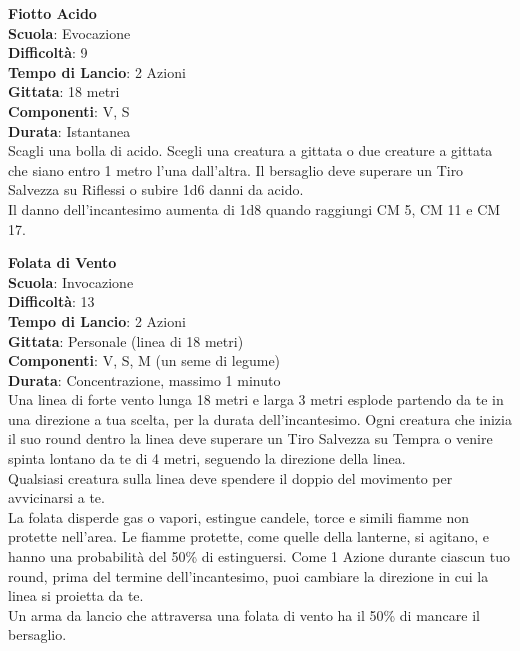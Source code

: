 \begin{multicols}{2}
\medskip\textbf{Fiotto Acido}\\
\textbf{Scuola}: Evocazione\\
\textbf{Difficoltà}: 9\\
\textbf{Tempo di Lancio}: 2 Azioni\\
\textbf{Gittata}: 18 metri\\
\textbf{Componenti}: V, S\\
\textbf{Durata}: Istantanea\\
Scagli una bolla di acido. Scegli una creatura a gittata o due creature a gittata che siano entro 1 metro l'una dall'altra. Il bersaglio deve superare un Tiro Salvezza su Riflessi o subire 1d6 danni da acido.\\
Il danno dell'incantesimo aumenta di 1d8 quando raggiungi CM 5, CM 11 e CM 17.

\medskip\textbf{Folata di Vento}\\
\textbf{Scuola}: Invocazione\\
\textbf{Difficoltà}: 13\\
\textbf{Tempo di Lancio}: 2 Azioni\\
\textbf{Gittata}: Personale (linea di 18 metri)\\
\textbf{Componenti}: V, S, M (un seme di legume)\\
\textbf{Durata}: Concentrazione, massimo 1 minuto\\
Una linea di forte vento lunga 18 metri e larga 3 metri esplode partendo da te in una direzione a tua scelta, per la durata dell'incantesimo. Ogni creatura che inizia il suo round dentro la linea deve superare un Tiro Salvezza su Tempra o venire spinta lontano da te di 4 metri, seguendo la direzione della linea.\\
Qualsiasi creatura sulla linea deve spendere il doppio del movimento per avvicinarsi a te.\\
La folata disperde gas o vapori, estingue candele, torce e simili fiamme non protette nell'area. Le fiamme protette, come quelle della lanterne, si agitano, e hanno una probabilità del 50\% di estinguersi. Come 1 Azione durante ciascun tuo round, prima del termine dell'incantesimo, puoi cambiare la direzione in cui la linea si proietta da te.\\
Un arma da lancio che attraversa una folata di vento ha il 50\% di mancare il bersaglio.


\end{multicols}
